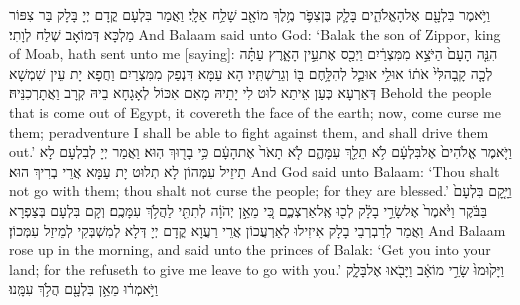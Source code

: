 {וַיֹּ֥אמֶר בִּלְעָ֖ם אֶל\maqqaf הָאֱלֹהִ֑ים בָּלָ֧ק בֶּן\maqqaf צִפֹּ֛ר מֶ֥לֶךְ מוֹאָ֖ב שָׁלַ֥ח אֵלָֽי׃}
{וַאֲמַר בִּלְעָם קֳדָם יְיָ בָּלָק בַּר צִפּוֹר מַלְכָּא דְּמוֹאָב שְׁלַח לְוָתִי׃}
{And Balaam said unto God: ‘Balak the son of Zippor, king of Moab, hath sent unto me [saying]:}{}
{הִנֵּ֤ה הָעָם֙ הַיֹּצֵ֣א מִמִּצְרַ֔יִם וַיְכַ֖ס אֶת\maqqaf עֵ֣ין הָאָ֑רֶץ עַתָּ֗ה לְכָ֤ה קָֽבָה\maqqaf לִּי֙ אֹת֔וֹ אוּלַ֥י אוּכַ֛ל לְהִלָּ֥חֶם בּ֖וֹ וְגֵרַשְׁתִּֽיו׃}
{הָא עַמָּא דִּנְפַק מִמִּצְרַיִם וַחֲפָא יָת עֵין שִׁמְשָׁא דְּאַרְעָא כְּעַן אֵיתַא לוּט לִי יָתֵיהּ מָאִם אִכּוֹל לְאָגָחָא בֵיהּ קְרָב וַאֲתָרְכִנֵּיהּ׃}
{Behold the people that is come out of Egypt, it covereth the face of the earth; now, come curse me them; peradventure I shall be able to fight against them, and shall drive them out.’}{}
{וַיֹּ֤אמֶר אֱלֹהִים֙ אֶל\maqqaf בִּלְעָ֔ם לֹ֥א תֵלֵ֖ךְ עִמָּהֶ֑ם לֹ֤א תָאֹר֙ אֶת\maqqaf הָעָ֔ם כִּ֥י בָר֖וּךְ הֽוּא׃}
{וַאֲמַר יְיָ לְבִלְעָם לָא תֵיזֵיל עִמְּהוֹן לָא תְלוּט יָת עַמָּא אֲרֵי בְרִיךְ הוּא׃}
{And God said unto Balaam: ‘Thou shalt not go with them; thou shalt not curse the people; for they are blessed.’}{}
{וַיָּ֤קׇם בִּלְעָם֙ בַּבֹּ֔קֶר וַיֹּ֙אמֶר֙ אֶל\maqqaf שָׂרֵ֣י בָלָ֔ק לְכ֖וּ אֶֽל\maqqaf אַרְצְכֶ֑ם כִּ֚י מֵאֵ֣ן יְהֹוָ֔ה לְתִתִּ֖י לַהֲלֹ֥ךְ עִמָּכֶֽם׃}
{וְקָם בִּלְעָם בְּצַפְרָא וַאֲמַר לְרַבְרְבֵי בָלָק אִיזִילוּ לְאַרְעֲכוֹן אֲרֵי רַעֲוָא קֳדָם יְיָ דְּלָא לְמִשְׁבְּקִי לְמֵיזַל עִמְּכוֹן׃}
{And Balaam rose up in the morning, and said unto the princes of Balak: ‘Get you into your land; for the \lord\space refuseth to give me leave to go with you.’}{}
{וַיָּק֙וּמוּ֙ שָׂרֵ֣י מוֹאָ֔ב וַיָּבֹ֖אוּ אֶל\maqqaf בָּלָ֑ק וַיֹּ֣אמְר֔וּ מֵאֵ֥ן בִּלְעָ֖ם הֲלֹ֥ךְ עִמָּֽנוּ׃}
